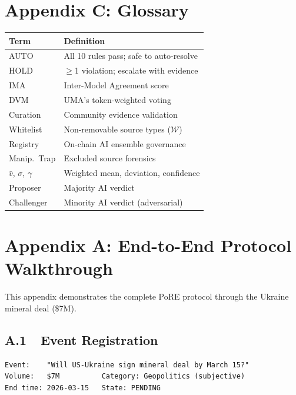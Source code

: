 \documentclass[11pt,a4paper,twocolumn]{article}
\begin{document}
\appendix

\section*{Appendix C: Glossary}

\begin{table}[H]
\centering
\scriptsize
\begin{tabularx}{\columnwidth}{@{}l>{\raggedright\arraybackslash}X@{}}
\toprule
\textbf{Term} & \textbf{Definition} \\
\midrule
AUTO & All 10 rules pass; safe to auto-resolve \\
HOLD & $\geq$1 violation; escalate with evidence \\
IMA & Inter-Model Agreement score \\
DVM & UMA's token-weighted voting \\
Curation & Community evidence validation \\
Whitelist & Non-removable source types ($\mathcal{W}$) \\
Registry & On-chain AI ensemble governance \\
Manip.\ Trap & Excluded source forensics \\
$\bar{v}$, $\sigma$, $\gamma$ & Weighted mean, deviation, confidence \\
Proposer & Majority AI verdict \\
Challenger & Minority AI verdict (adversarial) \\
\bottomrule
\end{tabularx}
\end{table}

\clearpage
\onecolumn

\section*{Appendix A: End-to-End Protocol Walkthrough}
\small  %
\hfuzz=12pt  %

This appendix demonstrates the complete PoRE protocol through the Ukraine mineral deal (\$7M).

\subsection*{A.1~~Event Registration}
\begin{lstlisting}
Event:    "Will US-Ukraine sign mineral deal by March 15?"
Volume:   $7M          Category: Geopolitics (subjective)
End time: 2026-03-15   State: PENDING
\end{lstlisting}
\end{document}
